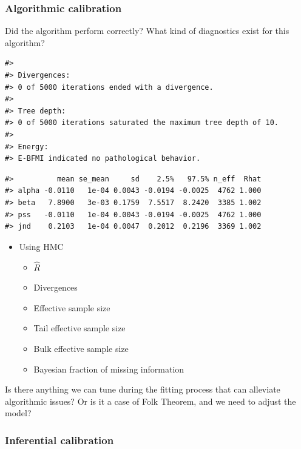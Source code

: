 \documentclass[11pt, oneside, openany]{scrbook}
\providecommand{\tightlist}{%
  \setlength{\itemsep}{0pt}\setlength{\parskip}{0pt}}
\begin{document}

\hypertarget{iter1-algo-calibration}{%
\subsubsection{Algorithmic calibration}\label{iter1-algo-calibration}}

Did the algorithm perform correctly? What kind of diagnostics exist for this algorithm?


\begin{verbatim}
#> 
#> Divergences:
#> 0 of 5000 iterations ended with a divergence.
#> 
#> Tree depth:
#> 0 of 5000 iterations saturated the maximum tree depth of 10.
#> 
#> Energy:
#> E-BFMI indicated no pathological behavior.
\end{verbatim}


\begin{verbatim}
#>          mean se_mean     sd    2.5%   97.5% n_eff  Rhat
#> alpha -0.0110   1e-04 0.0043 -0.0194 -0.0025  4762 1.000
#> beta   7.8900   3e-03 0.1759  7.5517  8.2420  3385 1.002
#> pss   -0.0110   1e-04 0.0043 -0.0194 -0.0025  4762 1.000
#> jnd    0.2103   1e-04 0.0047  0.2012  0.2196  3369 1.002
\end{verbatim}

\begin{itemize}
\tightlist
\item
  Using HMC

  \begin{itemize}
  \tightlist
  \item
    \(\hat{R}\)
  \item
    Divergences
  \item
    Effective sample size
  \item
    Tail effective sample size
  \item
    Bulk effective sample size
  \item
    Bayesian fraction of missing information
  \end{itemize}
\end{itemize}

Is there anything we can tune during the fitting process that can alleviate algorithmic issues? Or is it a case of Folk Theorem, and we need to adjust the model?

\hypertarget{iter1-inferential-calibration}{%
\subsubsection{Inferential calibration}\label{iter1-inferential-calibration}}
\end{document}
